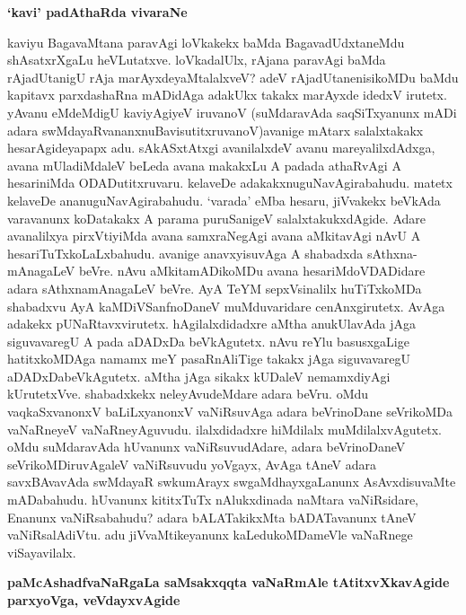 {\bigskip
\noindent
{\large\bf `kavi' padAthaRda vivaraNe}}\label{page184}
\medskip

\noindent
kaviyu BagavaMtana paravAgi loVkakekx baMda BagavadUdxtaneMdu shAsatxrXgaLu heVLutatxve. loVka\-dalUlx, rAjana paravAgi baMda rAjadUtanigU rAja marAyxdeyaMtalalxveV? adeV rAjadUtanenisikoMDu baMdu kapitavx parxdashaRna mADidAga adakUkx takakx marAyxde idedxV irutetx. yAvanu eMdeMdigU kavi\-yAgiyeV iruvanoV (suMdaravAda saqSiTxyanunx mADi adara swMdayaRvananxnuBavisutitxruvanoV)\break avanige mAtarx salalxtakakx hesarAgideyapapx adu. sAkASxtAtxgi avanilalxdeV avanu mare\-yalilxdAdxga, avana mUladiMdaleV beLeda avana makakxLu A padada athaRvAgi A hesariniMda ODADutitxruvaru. kelaveDe adakakxnuguNavAgirabahudu. matetx kelaveDe ananuguNavAgirabahudu. `varada' eMba hesaru, jiVvakekx beVkAda varavanunx koDa\-takakx A parama puruSanigeV salalxtakukxdAgide. Adare avanalilxya pirxVtiyiMda avana samxraNegAgi avana aMkitavAgi nAvU A hesariTuTxkoLaLxbahudu. avanige anavxyi\-suvAga A shabadxda sAthxna-\-mAnagaLeV beVre. nAvu aMkitamADikoMDu avana hesariMdoVDADidare adara sAthxnamAnagaLeV beVre. AyA TeYM sepxVsinalilx huTiTx\-koMDa shabadxvu AyA kaMDiVSanfnoDaneV muMduvaridare cenAnxgirutetx. AvAga adakekx pUNaRtavxvirutetx. hAgilalxdidadxre aMtha anukUlavAda jAga siguvavaregU A pada aDADxDa beVkAgutetx. nAvu reYlu basusxgaLige hatitxkoMDAga namamx meY pasaR\-nAliTige takakx jAga siguvavaregU aDADxDabeVkAgutetx. aMtha jAga sikakx kUDaleV nemamxdiyAgi kUrutetxVve. shabadxkekx neleyAvudeMdare adara beVru. oMdu vaqkaSxvanonxV baLiLxyanonxV vaNiRsuvAga adara beVrinoDane seVrikoMDa vaNaRneyeV vaNaRneyAguvudu. ilalxdidadxre hiMdilalx muMdilalxvAgutetx. oMdu suMdaravAda hUvanunx vaNiRsu\-vudAdare, adara beVrinoDaneV seVrikoMDiruvAgaleV vaNiRsuvudu yoVgayx, AvAga tAneV adara savxBAvavAda swMdayaR swkumArayx swgaMdhayxgaLanunx AsAvxdisuvaMte mADabahudu. hUvanunx kititxTuTx nAlukxdinada naMtara vaNiRsidare, Enanunx vaNiRsabahudu? adara bALATakikxMta bADATavanunx tAneV vaNiRsalAdiVtu. adu jiVvaMtikeyanunx kaLedukoMDameVle vaNaRnege viSayavilalx.

{\bigskip
\noindent
{\large\bf paMcAshadfvaNaRgaLa saMsakxqqta vaNaRmAle tAtitxvXkavAgide parxyoVga, veVdayxvAgide}}\label{page185}
\medskip

